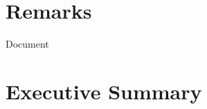 \setcounter{page}{1}

\chapter{Remarks}
Document

\tableofcontents
\thispagestyle{stylenor}

\chapter{Executive Summary}